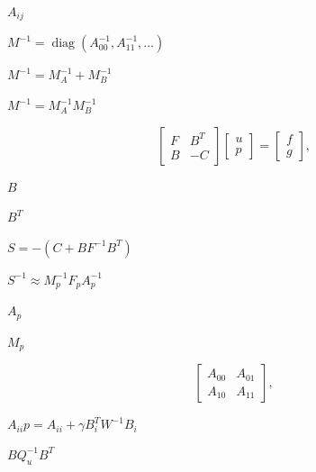 \documentclass{article}
\begin{document}
$A_{ij}$
\pagebreak

$M^{-1} = \operatorname{diag}(A_{00}^{-1}, A_{11}^{-1}, \dots)$
\pagebreak

$M^{-1} = M_A^{-1} + M_B^{-1}$
\pagebreak

$M^{-1} = M_A^{-1} M_B^{-1}$
\pagebreak

\[
\begin{bmatrix} F & B^T \\ B & -C \end{bmatrix}
\begin{bmatrix} u \\ p \end{bmatrix}
=
\begin{bmatrix} f \\ g \end{bmatrix},
\]
\pagebreak

$B$
\pagebreak

$B^T$
\pagebreak

$S = -(C + B F^{-1} B^T)$
\pagebreak

$S^{-1} \approx M_p^{-1} F_p A_p^{-1}$
\pagebreak

$A_p$
\pagebreak

$M_p$
\pagebreak

\[
\begin{bmatrix} A_{00} & A_{01} \\ A_{10} & A_{11} \end{bmatrix},
\]
\pagebreak

$A_{ii}p = A_{ii} + \gamma B_i^T W^{-1} B_i$
\pagebreak

$BQ_u^{-1}B^T$
\pagebreak
\end{document}
